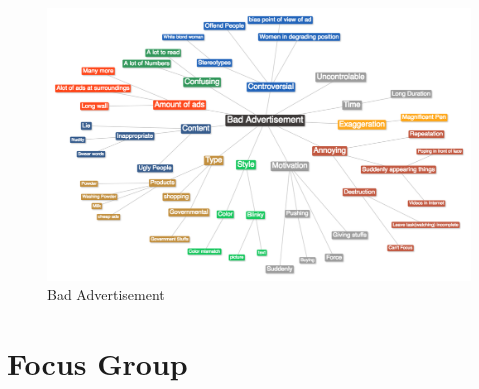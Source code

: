 \begin{appendices}
\begin{figure}[H]
 \centering 
    \includegraphics[width=\textwidth,height=0.45\textheight]{Appendices/3/bad_ad.jpg}
    \caption{Bad Advertisement}
     \label{app:badadver}%
\end{figure}



%

\chapter{Focus Group}


\end{appendices}
